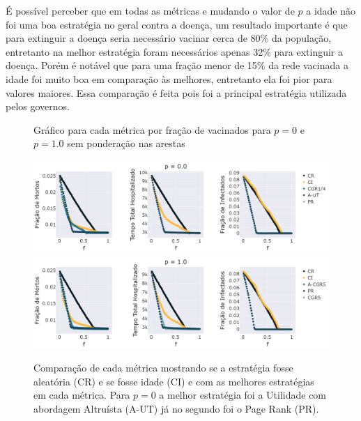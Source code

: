É possível perceber que em todas as métricas e mudando o valor de $p$ a idade não foi uma boa estratégia no geral contra a doença, um resultado importante é que para extinguir a doença seria necessário vacinar cerca de 80\% da população, entretanto na melhor estratégia foram necessários apenas 32\% para extinguir a doença. Porém é notável que para uma fração menor de 15\% da rede vacinada a idade foi muito boa em comparação às melhores, entretanto ela foi pior para valores maiores. Essa comparação é feita pois foi a principal estratégia utilizada pelos governos.

\begin{figure}[H]
    \centering
    \captionsetup{font=normalsize,skip=0.8pt,singlelinecheck=on,labelsep=endash}
    \caption{Gráfico para cada métrica por fração de vacinados para $p = 0$ e $p = 1.0$ sem ponderação nas arestas}
    \includegraphics[scale= 0.3]{figuras/compara_p_f_nponderado_0.0.png}
    \includegraphics[scale= 0.3]{figuras/compara_p_f_nponderado_1.0.png}
    \captionsetup{font=small,justification=justified}
    
    \caption*{Comparação de cada métrica mostrando se a estratégia fosse aleatória (CR) e se fosse idade (CI) e com as melhores estratégias em cada métrica. Para $p = 0$ a melhor estratégia foi a Utilidade com abordagem Altruísta (A-UT) já no segundo foi o Page Rank (PR). }
    \label{fig:resultados_metricas}
\end{figure}

